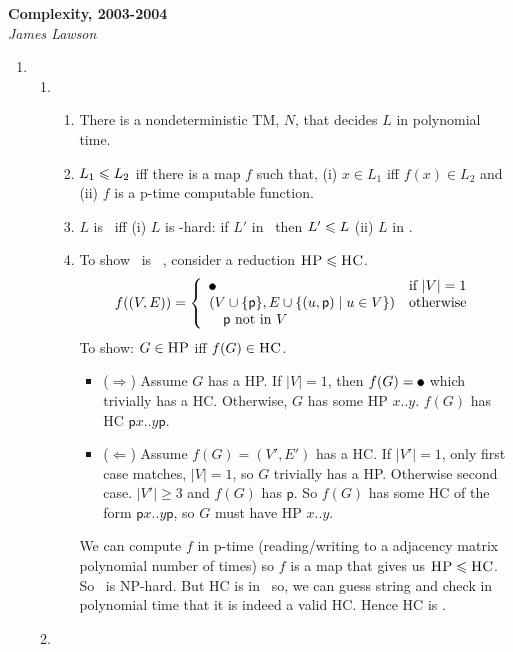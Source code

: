 \documentclass[a4paper, draft, 12pt]{article}
\begin{document}
\textbf{Complexity, 2003-2004}\\
\textit{James Lawson}

\begin{enumerate} 
\item %
\begin{enumerate}
\item %
  \begin{enumerate}
  \item %
  There is a nondeterministic TM, $N$, that decides $L$ in polynomial time. 
  \item
  $L_1 \leqslant L_2$ iff there is a map $f$ such that, (i) $x \in L_1$ iff $f(x) \in L_2$ 
  and (ii) $f$ is a p-time computable function.
  \item
  $L$ is \npc~iff (i) $L$ is -hard: if $L'$ in \np~then $L' \leqslant L$ (ii) $L$ in \np.
  \item
  To show ~is \npc~, consider a reduction $\textsc{HP} \leqslant \textsc{HC}$.
  $$
  f((V,E)) = \left\{ 
  \begin{array}{ll}
    \onegraph    & \text{if } |V| = 1 \\
    (V \cup \{\textsf{p}\}, E \cup \{ (u, \textsf{p}) \;|\; u \in V \} )  & \text{otherwise} \\
    \quad \textsf{p} \text{ not in } V &\\
  \end{array} \right.
  $$
  To show: $G \in \textsc{HP}$ iff $f(G) \in \textsc{HC}$.
  \begin{itemize}
  \item ($\Rightarrow$) Assume $G$ has a HP. 
  If $|V| = 1$, then $f(G) = \onegraph$ which trivially has a HC.
  Otherwise, $G$ has some HP $x..y$. $f(G)$ has HC $\textsf{p}x..y\textsf{p}$. 
  \item ($\Leftarrow$) Assume $f(G) = (V',E')$ has a HC. 
  If $|V'| = 1$, only first case matches, $|V| = 1$, so $G$ trivially has a HP.
  Otherwise second case. $|V'| \geqslant 3$ and $f(G)$ has $\textsf{p}$. 
  So $f(G)$ has some HC of the form $\textsf{p}x..y\textsf{p}$, so $G$ must have HP $x..y$. 
  \end{itemize}
  We can compute $f$ in p-time (reading/writing to a adjacency matrix polynomial number of times) 
  so $f$ is a map that gives us $\textsc{HP} \leqslant \textsc{HC}$. 
  So \hc~is NP-hard. But HC is in \np~so, we can guess string and check in polynomial time that 
  it is indeed a valid HC. Hence HC is \npc.
  \end{enumerate}
\item %
  \begin{enumerate}

\end{enumerate}
\end{enumerate}
\end{enumerate}
\end{document}
